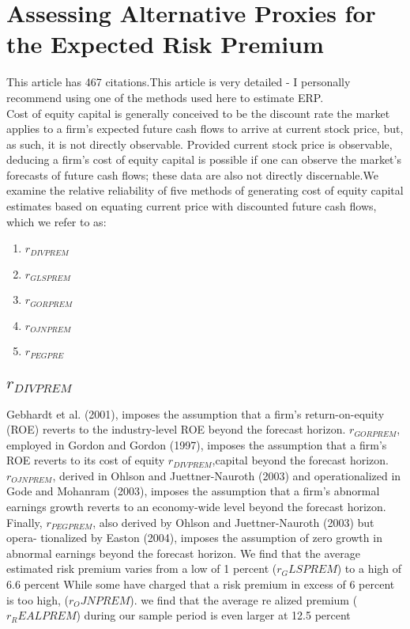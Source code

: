 \documentclass[12 pt]{article}
\begin{document}
\section{Assessing Alternative Proxies for the Expected Risk Premium}
This article has 467 citations.This article is very detailed - I personally recommend using one of the methods used here to estimate ERP.\\
Cost of equity capital is generally conceived to be the
discount rate the market applies to a firm's expected future cash flows to arrive at current
stock price, but, as such, it is not directly observable. Provided current stock price is observable, deducing a firm's cost of equity capital is possible if one can observe the
market's forecasts of future cash flows; these data are also not directly discernable.We examine the relative reliability of five methods of
generating cost of equity capital estimates based on equating current price with discounted
future cash flows, which we refer to as: 
\begin{enumerate}
\item $r_{DIVPREM}$
\item $r_{GLSPREM}$
\item $r_{GORPREM}$
\item $r_{OJNPREM}$
\item $r_{PEGPRE}$
\end{enumerate}
\subsection{$r_{DIVPREM}$}
Gebhardt et al. (2001), imposes the assumption that a firm's return-on-equity (ROE) reverts
to the industry-level ROE beyond the forecast horizon. $r_{GORPREM}$, employed in Gordon and
Gordon (1997), imposes the assumption that a firm's ROE reverts to its cost of equity
$r_{DIVPREM}$,capital beyond the forecast horizon.
$r_{OJNPREM}$, derived
in Ohlson and Juettner-Nauroth
(2003) and operationalized in Gode and Mohanram (2003), imposes the assumption that a
firm's abnormal earnings growth reverts to an economy-wide level beyond the forecast
horizon. Finally,
$r_{PEGPREM}$, also
derived by Ohlson and Juettner-Nauroth (2003) but opera-
tionalized by Easton (2004), imposes the assumption of zero growth in abnormal earnings
beyond the forecast horizon. We find that the average
estimated risk premium varies from a low of 1 percent ($r_GLSPREM$) to a high of 6.6 percent
While some have charged that a risk premium in excess of 6 percent is too high,
($r_OJNPREM$).
we find that the average re	alized premium ($r_REALPREM$) during our sample period is even
larger at 12.5 percent
\end{document}

